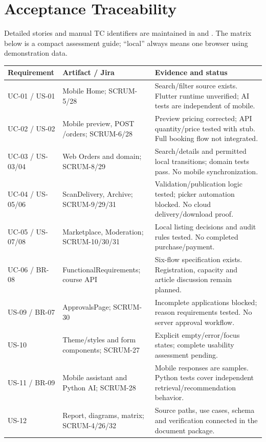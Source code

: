 \section{Acceptance Traceability}
Detailed stories and manual TC identifiers are maintained in
 and .
The matrix below is a compact assessment guide; ``local'' always means one
browser using demonstration data.
\begin{longtable}{p{}p{}p{}}
\toprule\textbf{Requirement} & \textbf{Artifact / Jira} & \textbf{Evidence and status}\\\midrule\endhead
UC-01 / US-01 & Mobile Home; SCRUM-5/28 & Search/filter source exists. Flutter runtime unverified; AI tests are independent of mobile.\\
UC-02 / US-02 & Mobile preview, POST /orders; SCRUM-6/28 & Preview pricing corrected; API quantity/price tested with stub. Full booking flow not integrated.\\
UC-03 / US-03/04 & Web Orders and domain; SCRUM-8/29 & Search/details and permitted local transitions; domain tests pass. No mobile synchronization.\\
UC-04 / US-05/06 & ScanDelivery, Archive; SCRUM-9/29/31 & Validation/publication logic tested; picker automation blocked. No cloud delivery/download proof.\\
UC-05 / US-07/08 & Marketplace, Moderation; SCRUM-10/30/31 & Local listing decisions and audit rules tested. No completed purchase/payment.\\
UC-06 / BR-08 & FunctionalRequirements; course API & Six-flow specification exists. Registration, capacity and article discussion remain planned.\\
US-09 / BR-07 & ApprovalsPage; SCRUM-30 & Incomplete applications blocked; reason requirements tested. No server approval workflow.\\
US-10 & Theme/styles and form components; SCRUM-27 & Explicit empty/error/focus states; complete usability assessment pending.\\
US-11 / BR-09 & Mobile assistant and Python AI; SCRUM-28 & Mobile responses are samples. Python tests cover independent retrieval/recommendation behavior.\\
US-12 & Report, diagrams, matrix; SCRUM-4/26/32 & Source paths, use cases, schema and verification connected in the document package.\\
\bottomrule
\end{longtable}

